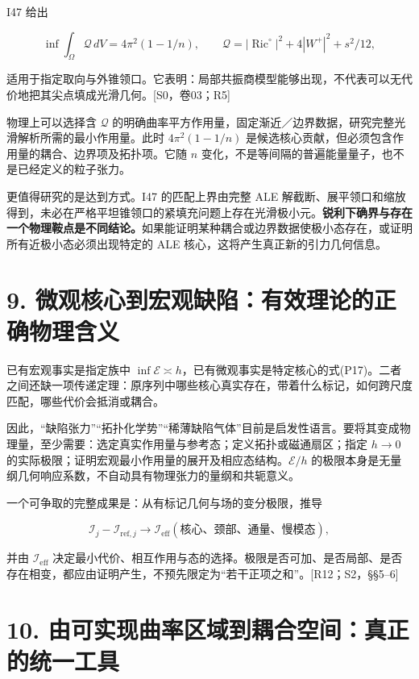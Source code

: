 \documentclass[UTF8,a4paper,11pt,fontset=fandol]{ctexart}
\begin{document}
I47 给出

\[
\inf\int_\Omega\mathscr Q\,dV
=4\pi^2(1-1/n),\qquad
\mathscr Q=|\operatorname{Ric}^{\circ}|^2+4|W^+|^2+s^2/12,
\tag{P17}
\]

适用于指定取向与外锥领口。它表明：局部共振商模型能够出现，不代表可以无代价地把其尖点填成光滑几何。{[}S0，卷03；R5{]}

物理上可以选择含 \(\mathscr Q\)
的明确曲率平方作用量，固定渐近／边界数据，研究完整光滑解析所需的最小作用量。此时
\(4\pi^2(1-1/n)\)
是候选核心贡献，但必须包含作用量的耦合、边界项及拓扑项。它随 \(n\)
变化，不是等间隔的普遍能量量子，也不是已经定义的粒子张力。

更值得研究的是达到方式。I47 的匹配上界由完整 ALE
解截断、展平领口和缩放得到，未必在严格平坦锥领口的紧填充问题上存在光滑极小元。\textbf{锐利下确界与存在一个物理鞍点是不同结论。}如果能证明某种耦合或边界数据使极小态存在，或证明所有近极小态必须出现特定的
ALE 核心，这将产生真正新的引力几何信息。

\section{9.
微观核心到宏观缺陷：有效理论的正确物理含义}\label{ux5faeux89c2ux6838ux5fc3ux5230ux5b8fux89c2ux7f3aux9677ux6709ux6548ux7406ux8bbaux7684ux6b63ux786eux7269ux7406ux542bux4e49}

已有宏观事实是指定族中
\(\inf\mathcal E\asymp h\)，已有微观事实是特定核心的式(P17)。二者之间还缺一项传递定理：原序列中哪些核心真实存在，带着什么标记，如何跨尺度匹配，哪些代价会抵消或耦合。

因此，``缺陷张力''``拓扑化学势''``稀薄缺陷气体''目前是启发性语言。要将其变成物理量，至少需要：选定真实作用量与参考态；定义拓扑或磁通扇区；指定
\(h\to0\)
的实际极限；证明宏观最小作用量的展开及相应态结构。\(\mathcal E/h\)
的极限本身是无量纲几何响应系数，不自动具有物理张力的量纲和共轭意义。

一个可争取的完整成果是：从有标记几何与场的变分极限，推导

\[
\mathscr I_j-\mathscr I_{\mathrm{ref},j}
\longrightarrow
\mathscr I_{\mathrm{eff}}(\text{核心、颈部、通量、慢模态}),
\tag{P18}
\]

并由 \(\mathscr I_{\mathrm{eff}}\)
决定最小代价、相互作用与态的选择。极限是否可加、是否局部、是否存在相变，都应由证明产生，不预先限定为``若干正项之和''。{[}R12；S2，§§5--6{]}

\section{10.
由可实现曲率区域到耦合空间：真正的统一工具}\label{ux7531ux53efux5b9eux73b0ux66f2ux7387ux533aux57dfux5230ux8026ux5408ux7a7aux95f4ux771fux6b63ux7684ux7edfux4e00ux5de5ux5177}
\end{document}
